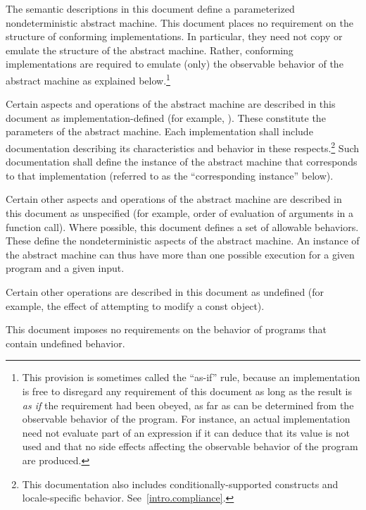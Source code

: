 \pnum
{}%
%
The semantic descriptions in this document define a
parameterized nondeterministic abstract machine. This document
places no requirement on the structure of conforming
implementations. In particular, they need not copy or emulate the
structure of the abstract machine.
%
%
Rather, conforming implementations are required to emulate (only) the observable
behavior of the abstract machine as explained below.\footnote{This provision is
sometimes called the ``as-if'' rule, because an implementation is free to
disregard any requirement of this document as long as the result
is \emph{as if} the requirement had been obeyed, as far as can be determined
from the observable behavior of the program. For instance, an actual
implementation need not evaluate part of an expression if it can deduce that its
value is not used and that no
%
side effects affecting the
observable behavior of the program are produced.}

\pnum
{}%
Certain aspects and operations of the abstract machine are described in this
document as implementation-defined (for example,
). These constitute the parameters of the abstract machine.
Each implementation shall include documentation describing its characteristics
and behavior in these respects.\footnote{This documentation also includes
conditionally-supported constructs and locale-specific behavior.
See~\ref{intro.compliance}.} Such documentation shall define the instance of the
abstract machine that corresponds to that implementation (referred to as the
``corresponding instance'' below).

\pnum
{}%
Certain other aspects and operations of the abstract machine are
described in this document as unspecified (for example,
order of evaluation of arguments in a function call).
Where possible, this
document defines a set of allowable behaviors. These
define the nondeterministic aspects of the abstract machine. An instance
of the abstract machine can thus have more than one possible execution
for a given program and a given input.

\pnum
{}%
Certain other operations are described in this document as
undefined (for example, the effect of
attempting to modify a const object).
\begin{note}
This document imposes no requirements on the
behavior of programs that contain undefined behavior.
\end{note}

